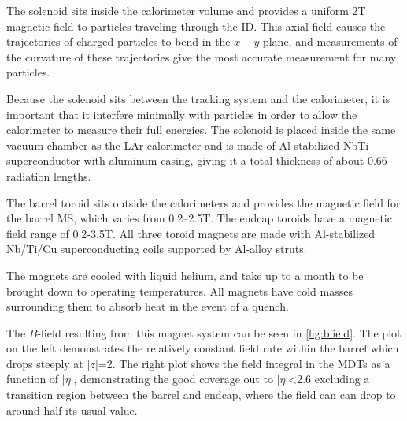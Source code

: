 The solenoid sits inside the calorimeter volume and provides a uniform 2T magnetic field to particles traveling through the \ac{ID}. This axial field causes the trajectories of charged particles to bend in the $x-y$ plane, and measurements of the curvature of these trajectories give the most accurate \pt measurement for many particles. 

Because the solenoid sits between the tracking system and the calorimeter, it is important that it interfere minimally with particles in order to allow the calorimeter to measure their full energies. The solenoid is placed inside the same vacuum chamber as the LAr calorimeter and is made of Al-stabilized NbTi superconductor with aluminum casing, giving it a total thickness of about 0.66 radiation lengths. 

The barrel toroid sits outside the calorimeters and provides the magnetic field for the barrel \ac{MS}, which varies from 0.2–2.5T. The endcap toroids have a magnetic field range of 0.2-3.5T. All three toroid magnets are made with Al-stabilized Nb/Ti/Cu superconducting coils supported by Al-alloy struts. 

The magnets are cooled with liquid helium, and take up to a month to be brought down to operating temperatures. All magnets have cold masses surrounding them to absorb heat in the event of a quench. 

The $B$-field resulting from this magnet system can be seen in \autoref{fig:bfield}. The plot on the left demonstrates the relatively constant field rate within the barrel which drops steeply at $|z|$=2. The right plot shows the field integral in the \acp{MDT} as a function of $|\eta|$, demonstrating the good coverage out to $|\eta|$<2.6 excluding a transition region between the barrel and endcap, where the field can can drop to around half its usual value. 


